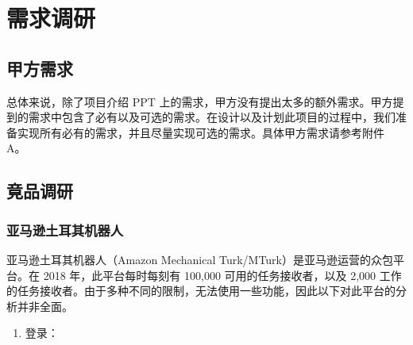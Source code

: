 \section{需求调研}

\subsection{甲方需求}

总体来说，除了项目介绍 PPT 上的需求，甲方没有提出太多的额外需求。甲方提到的需求中包含了必有以及可选的需求。在设计以及计划此项目的过程中，我们准备实现所有必有的需求，并且尽量实现可选的需求。具体甲方需求请参考附件 A。

\subsection{竟品调研}

\subsubsection{亚马逊土耳其机器人}

亚马逊土耳其机器人（Amazon Mechanical Turk/MTurk）是亚马逊运营的众包平台。在 2018 年，此平台每时每刻有 100,000 可用的任务接收者，以及 2,000 工作的任务接收者。由于多种不同的限制，无法使用一些功能，因此以下对此平台的分析并非全面。

\begin{enumerate}
    \item 登录：
\end{enumerate}